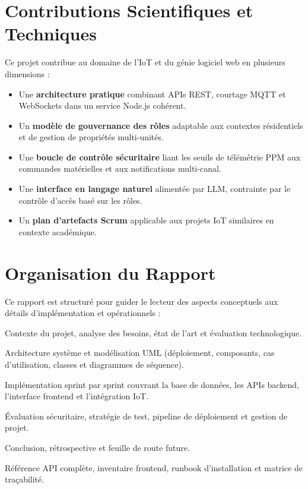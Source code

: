 \section{Contributions Scientifiques et Techniques}

Ce projet contribue au domaine de l'IoT et du génie logiciel web en plusieurs dimensions :

\begin{itemize}[leftmargin=1.5cm,itemsep=6pt]
  \item Une \textbf{architecture pratique} combinant APIs REST, courtage MQTT et WebSockets
        dans un service Node.js cohérent.
  \item Un \textbf{modèle de gouvernance des rôles} adaptable aux contextes résidentiels
        et de gestion de propriétés multi-unités.
  \item Une \textbf{boucle de contrôle sécuritaire} liant les seuils de télémétrie PPM
        aux commandes matérielles et aux notifications multi-canal.
  \item Une \textbf{interface en langage naturel} alimentée par LLM, contrainte par le
        contrôle d'accès basé sur les rôles.
  \item Un \textbf{plan d'artefacts Scrum} applicable aux projets IoT similaires en
        contexte académique.
\end{itemize}

\section{Organisation du Rapport}

Ce rapport est structuré pour guider le lecteur des aspects conceptuels aux détails
d'implémentation et opérationnels :

\begin{description}[leftmargin=1.5cm,itemsep=6pt]
  \item[Chapitres 1--3 :] Contexte du projet, analyse des besoins, état de l'art et
        évaluation technologique.
  \item[Chapitre 4 :] Architecture système et modélisation UML (déploiement, composants,
        cas d'utilisation, classes et diagrammes de séquence).
  \item[Chapitres 5--8 :] Implémentation sprint par sprint couvrant la base de données,
        les APIs backend, l'interface frontend et l'intégration IoT.
  \item[Chapitres 9--11 :] Évaluation sécuritaire, stratégie de test, pipeline de
        déploiement et gestion de projet.
  \item[Chapitre 12 :] Conclusion, rétrospective et feuille de route future.
  \item[Annexes (13--16) :] Référence API complète, inventaire frontend, runbook
        d'installation et matrice de traçabilité.
\end{description}
